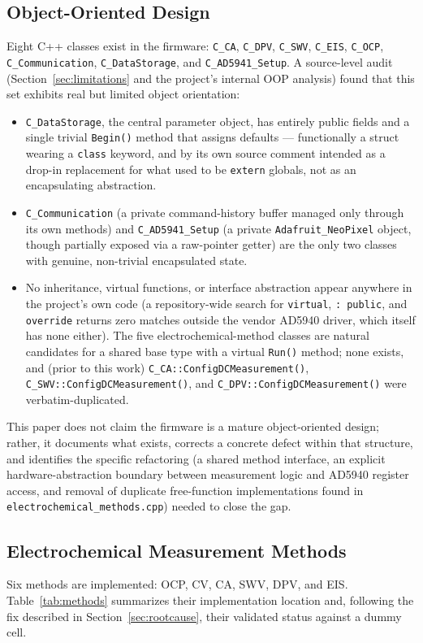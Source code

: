\documentclass[journal]{IEEEtran}
\begin{document}
\subsection{Object-Oriented Design}
\label{sec:oop}
Eight C++ classes exist in the firmware: \texttt{C\_CA}, \texttt{C\_DPV}, \texttt{C\_SWV}, \texttt{C\_EIS}, \texttt{C\_OCP}, \texttt{C\_Communication}, \texttt{C\_DataStorage}, and \texttt{C\_AD5941\_Setup}. A source-level audit (Section~\ref{sec:limitations} and the project's internal OOP analysis) found that this set exhibits real but limited object orientation:
\begin{itemize}
\item \texttt{C\_DataStorage}, the central parameter object, has entirely public fields and a single trivial \texttt{Begin()} method that assigns defaults --- functionally a struct wearing a \texttt{class} keyword, and by its own source comment intended as a drop-in replacement for what used to be \texttt{extern} globals, not as an encapsulating abstraction.
\item \texttt{C\_Communication} (a private command-history buffer managed only through its own methods) and \texttt{C\_AD5941\_Setup} (a private \texttt{Adafruit\_NeoPixel} object, though partially exposed via a raw-pointer getter) are the only two classes with genuine, non-trivial encapsulated state.
\item No inheritance, virtual functions, or interface abstraction appear anywhere in the project's own code (a repository-wide search for \texttt{virtual}, \texttt{: public}, and \texttt{override} returns zero matches outside the vendor AD5940 driver, which itself has none either). The five electrochemical-method classes are natural candidates for a shared base type with a virtual \texttt{Run()} method; none exists, and (prior to this work) \texttt{C\_CA::ConfigDCMeasurement()}, \texttt{C\_SWV::ConfigDCMeasurement()}, and \texttt{C\_DPV::ConfigDCMeasurement()} were verbatim-duplicated.
\end{itemize}
This paper does not claim the firmware is a mature object-oriented design; rather, it documents what exists, corrects a concrete defect within that structure, and identifies the specific refactoring (a shared method interface, an explicit hardware-abstraction boundary between measurement logic and AD5940 register access, and removal of duplicate free-function implementations found in \texttt{electrochemical\_methods.cpp}) needed to close the gap.

\subsection{Electrochemical Measurement Methods}
Six methods are implemented: OCP, CV, CA, SWV, DPV, and EIS. Table~\ref{tab:methods} summarizes their implementation location and, following the fix described in Section~\ref{sec:rootcause}, their validated status against a dummy cell.
\end{document}
